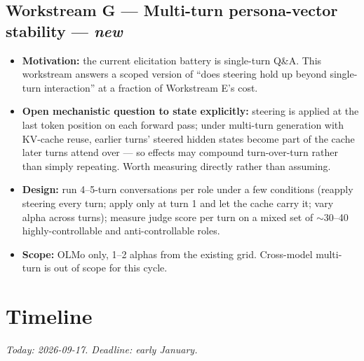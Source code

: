 \documentclass[11pt]{article}
\newcommand{\workstream}[2]{\subsection*{Workstream #1 --- #2}}
\begin{document}
\workstream{G}{Multi-turn persona-vector stability --- \emph{new}}
\begin{itemize}
  \item \textbf{Motivation:} the current elicitation battery is single-turn Q\&A. This
    workstream answers a scoped version of ``does steering hold up beyond single-turn
    interaction'' at a fraction of Workstream E's cost.
  \item \textbf{Open mechanistic question to state explicitly:} steering is applied at the
    last token position on each forward pass; under multi-turn generation with KV-cache
    reuse, earlier turns' steered hidden states become part of the cache later turns
    attend over --- so effects may compound turn-over-turn rather than simply repeating.
    Worth measuring directly rather than assuming.
  \item \textbf{Design:} run 4--5-turn conversations per role under a few conditions
    (reapply steering every turn; apply only at turn 1 and let the cache carry it; vary
    alpha across turns); measure judge score per turn on a mixed set of $\sim$30--40
    highly-controllable and anti-controllable roles.
  \item \textbf{Scope:} OLMo only, 1--2 alphas from the existing grid. Cross-model
    multi-turn is out of scope for this cycle.
\end{itemize}

\section*{Timeline}
\emph{Today: 2026-09-17. Deadline: early January.}
\end{document}
